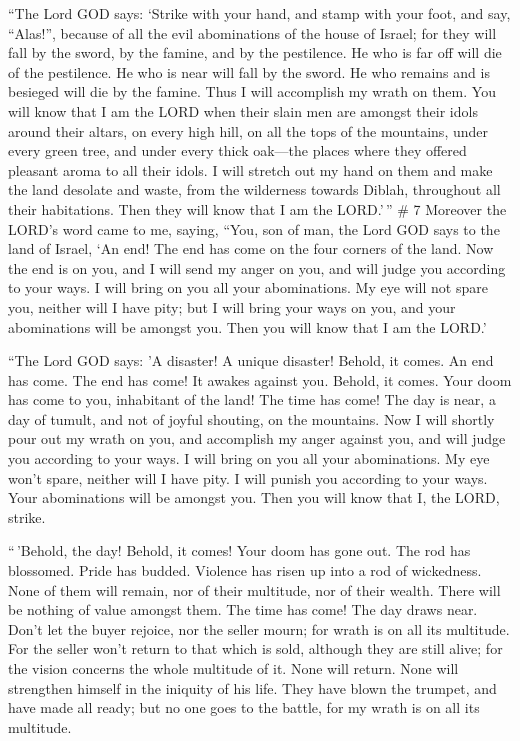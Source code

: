  ``The Lord GOD says: `Strike with your hand, and stamp
with your foot, and say, ``Alas!'', because of all the evil abominations
of the house of Israel; for they will fall by the sword, by the famine,
and by the pestilence.  He who is far off will die of the
pestilence. He who is near will fall by the sword. He who remains and is
besieged will die by the famine. Thus I will accomplish my wrath on
them.  You will know that I am the LORD when their slain
men are amongst their idols around their altars, on every high hill, on
all the tops of the mountains, under every green tree, and under every
thick oak---the places where they offered pleasant aroma to all their
idols.  I will stretch out my hand on them and make the
land desolate and waste, from the wilderness towards Diblah, throughout
all their habitations. Then they will know that I am the LORD.'\,'' \# 7
 Moreover the LORD's word came to me, saying,
 ``You, son of man, the Lord GOD says to the land of
Israel, `An end! The end has come on the four corners of the land.
 Now the end is on you, and I will send my anger on you,
and will judge you according to your ways. I will bring on you all your
abominations.  My eye will not spare you, neither will I
have pity; but I will bring your ways on you, and your abominations will
be amongst you. Then you will know that I am the LORD.'

 ``The Lord GOD says: 'A disaster! A unique disaster!
Behold, it comes.  An end has come. The end has come! It
awakes against you. Behold, it comes.  Your doom has come
to you, inhabitant of the land! The time has come! The day is near, a
day of tumult, and not of joyful shouting, on the mountains.
 Now I will shortly pour out my wrath on you, and
accomplish my anger against you, and will judge you according to your
ways. I will bring on you all your abominations.  My eye
won't spare, neither will I have pity. I will punish you according to
your ways. Your abominations will be amongst you. Then you will know
that I, the LORD, strike.

 ``\,'Behold, the day! Behold, it comes! Your doom has
gone out. The rod has blossomed. Pride has budded. 
Violence has risen up into a rod of wickedness. None of them will
remain, nor of their multitude, nor of their wealth. There will be
nothing of value amongst them.  The time has come! The
day draws near. Don't let the buyer rejoice, nor the seller mourn; for
wrath is on all its multitude.  For the seller won't
return to that which is sold, although they are still alive; for the
vision concerns the whole multitude of it. None will return. None will
strengthen himself in the iniquity of his life.  They
have blown the trumpet, and have made all ready; but no one goes to the
battle, for my wrath is on all its multitude.

